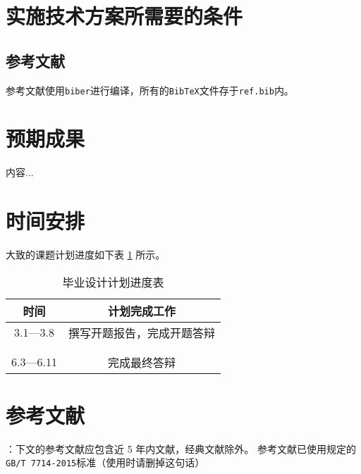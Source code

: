 \documentclass[UTF8,AutoFakeBold,AutoFakeSlant,zihao=-4]{ctexart}
\numberwithin{equation}{section}
\begin{document}
\newpage
\section{实施技术方案所需要的条件}
\setcounter{figure}{0}
\setcounter{table}{0}
\setlength{\baselineskip}{22pt}
\begin{ubox}
\subsection{参考文献}

参考文献使用\texttt{biber}进行编译，所有的\texttt{BibTeX}文件存于\texttt{ref.bib}内。
\subsection{}
\end{ubox}

\newpage
\section{预期成果}
\setcounter{figure}{0}
\setcounter{table}{0}
\setlength{\baselineskip}{22pt}
\begin{ubox}
	内容...
\end{ubox}

\newpage
\section{时间安排}
\setcounter{figure}{0}
\setcounter{table}{0}
\setlength{\baselineskip}{22pt}
\begin{ubox}
大致的课题计划进度如下表 \ref{tab:progress} 所示。

\renewcommand*\arraystretch{1.5} 
\begin{table}[H]
  \centering
  \caption{毕业设计计划进度表}
  \label{tab:progress}
  \begin{tabular}{@{}cc@{}}
    \toprule
    时间 & 计划完成工作       \\ \midrule
    3.1—3.8 & 撰写开题报告，完成开题答辩 \\\hline
    & \\\hline
    & \\\hline
    6.3—6.11 & 完成最终答辩\\\bottomrule
  \end{tabular}

\end{table}

\end{ubox}

\newpage
\section{参考文献}
\begin{ubox}
：下文的参考文献应包含近 5 年内文献，经典文献除外。 参考文献已使用规定的\texttt{GB/T 7714-2015}标准（使用时请删掉这句话）
\printbibliography[heading=none]
\end{ubox}
\end{document}

